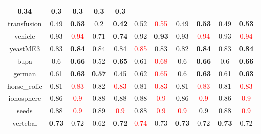 \documentclass{article}%
\begin{document}
\begin{tabular}{c|cccccccccc}
{0.34
}&0.3&0.3&0.3&0.3\\%
\hline%
transfusion&0.49&\textbf{0.53}&0.2&\textbf{0.42}&0.52&\textcolor{red}{ 
0.55
}&0.49&\textbf{0.53}&0.49&\textbf{0.53}\\%
\hline%
vehicle&0.93&\textcolor{red}{ 
0.94
}&0.71&\textbf{0.74}&0.92&\textbf{0.93}&0.93&\textcolor{red}{ 
0.94
}&0.93&\textcolor{red}{ 
0.94
}\\%
\hline%
yeastME3&0.83&\textbf{0.84}&0.84&0.84&\textcolor{red}{ 
0.85
}&0.83&0.82&\textbf{0.84}&0.83&\textbf{0.84}\\%
\hline%
bupa&0.6&\textbf{0.66}&0.52&\textbf{0.65}&0.61&\textcolor{red}{ 
0.68
}&0.6&\textbf{0.66}&0.6&\textbf{0.66}\\%
\hline%
german&0.61&\textbf{0.63}&\textbf{0.57}&0.45&0.62&\textcolor{red}{ 
0.65
}&0.6&\textbf{0.63}&0.61&\textbf{0.63}\\%
\hline%
horse\_colic&0.81&\textcolor{red}{ 
0.83
}&0.82&\textcolor{red}{ 
0.83
}&0.81&\textcolor{red}{ 
0.83
}&0.81&\textcolor{red}{ 
0.83
}&0.81&\textcolor{red}{ 
0.83
}\\%
\hline%
ionosphere&0.86&\textcolor{red}{ 
0.9
}&0.88&0.88&0.88&\textcolor{red}{ 
0.9
}&0.86&\textcolor{red}{ 
0.9
}&0.86&\textcolor{red}{ 
0.9
}\\%
\hline%
seeds&0.88&\textcolor{red}{ 
0.9
}&0.89&\textcolor{red}{ 
0.9
}&0.88&\textcolor{red}{ 
0.9
}&\textcolor{red}{ 
0.9
}&0.9&0.88&\textcolor{red}{ 
0.9
}\\%
\hline%
vertebal&\textbf{0.73}&0.72&0.62&\textbf{0.72}&\textcolor{red}{ 
0.74
}&0.73&\textbf{0.73}&0.72&\textbf{0.73}&0.72\\%
\hline%
\end{tabular}

%
\end{document}
